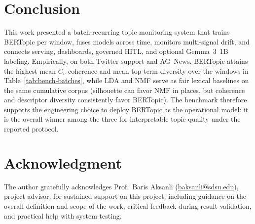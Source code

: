 \documentclass[conference]{IEEEtran}
\newcommand{\bertopic}{BERTopic\xspace}
\newcommand{\lda}{LDA\xspace}
\newcommand{\nmf}{NMF\xspace}
\newcommand{\hitl}{HITL\xspace}
\begin{document}
\section{Conclusion}
This work presented a batch-recurring topic monitoring system that trains \bertopic per window, fuses models across time, monitors multi-signal drift, and connects serving, dashboards, governed \hitl, and optional Gemma~3~1B labeling. Empirically, on both Twitter support and AG~News, \bertopic attains the highest mean $C_v$ coherence and mean top-term diversity over the windows in Table~\ref{tab:bench-batches}, while \lda and \nmf serve as fair lexical baselines on the same cumulative corpus (silhouette can favor \nmf in places, but coherence and descriptor diversity consistently favor \bertopic). The benchmark therefore supports the engineering choice to deploy \bertopic as the operational model: it is the overall winner among the three for interpretable topic quality under the reported protocol.

\section*{Acknowledgment}
The author gratefully acknowledges Prof.~Baris Aksanli (\url{baksanli@sdsu.edu}), project advisor, for sustained support on this project, including guidance on the overall definition and scope of the work, critical feedback during result validation, and practical help with system testing.
\end{document}

